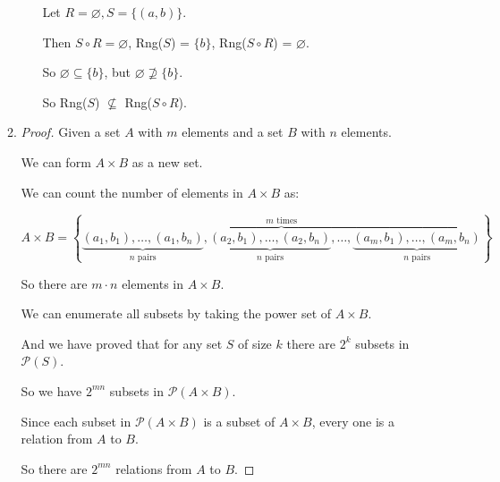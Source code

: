 \documentclass[12pt,letterpaper]{article}
\begin{document}
\begin{enumerate}
\begin{enumerate}
\begin{enumerate}
              Let $R = \varnothing, S = \{(a, b)\}$.

              Then $S \circ R = \varnothing$, Rng($S$) = $\{b\}$, Rng($S \circ R$) = $\varnothing$.

              So $\varnothing \subseteq \{b\}$, but $\varnothing \not\supseteq \{b\}$.

              So Rng($S$) $\not\subseteq$ Rng($S \circ R$).
          \end{enumerate}
        \setcounter{enumii}{11}
        \item
          \begin{proof}
            Given a set $A$ with $m$ elements and a set $B$ with $n$ elements.

            We can form $A \times B$ as a new set.

            We can count the number of elements in $A \times B$ as:

            \[A \times B = \left\{\overbrace{\underbrace{(a_1, b_1), \dots, (a_1, b_n)}_{n \text{ pairs}}, \underbrace{(a_2, b_1), \dots, (a_2, b_n)}_{n \text{ pairs}}, \dots, \underbrace{(a_m, b_1), \dots, (a_m, b_n)}_{n \text{ pairs}}}^{m \text{ times}}\right\}\]

            So there are $m \cdot n$ elements in $A \times B$.

            We can enumerate all subsets by taking the power set of $A \times B$.

            And we have proved that for any set $S$ of size $k$ there are $2^k$ subsets in $\mathcal{P}(S)$.

            So we have $2^{mn}$ subsets in $\mathcal{P}(A \times B)$.

            Since each subset in $\mathcal{P}(A \times B)$ is a subset of $A \times B$, every one is a relation from $A$ to $B$.

            So there are $2^{mn}$ relations from $A$ to $B$.
          \end{proof}
      \end{enumerate}
  \end{enumerate}
\end{document}
